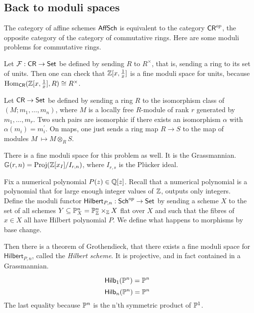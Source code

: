 \documentclass[11pt, english]{article}
\begin{document}
\subsection{Back to moduli spaces}

The category of affine schemes $\mathsf{AffSch}$ is equivalent to the category $\mathsf{CR}^{op}$, the opposite category of the category of commutative rings. Here are some moduli problems for commutative rings.

\begin{example}
Let $\mathcal F:\mathsf{CR} \to \mathsf{Set}$ be defined by sending $R$ to $R^\times$, that is, sending a ring to its set of units. Then one can check that $\mathbb{Z}[x,\frac 1x]$ is a fine moduli space for units, because $\operatorname{Hom}_{\mathsf{CR}}(\mathbb{Z}[x,\frac 1x],R) \cong R^\times$.
\end{example}

\begin{example}
Let $\mathsf{CR} \to \mathsf{Set}$ be defined by sending a ring $R$ to the isomorphism class of $(M;m_1,\dotsc,m_n)$, where $M$ is a locally free $R$-module of rank $r$ generated by $m_1,\dotsc,m_r$. Two such pairs are isomorphic if there exists an isomorphism $\alpha$ with $\alpha(m_i)=m_i^\prime$. On maps, one just sends a ring map $R \to S$ to the map of modules $M \ \mapsto M \otimes_R S$.

There is a fine moduli space for this problem as well. It is the Grassmannian. $\mathbb{G}(r,n)= \operatorname{Proj}(\mathbb{Z}[x_I]/I_{r,n})$, where $I_{r,s}$ is the Plücker ideal. 
\end{example}

\begin{example}
Fix a numerical polynomial $P(z) \in \mathbb{Q}[z]$. Recall that a numerical polynomial is a polynomial that for large enough integer values of $\mathbb{Z}$, outputs only integers. Define the moduli functor $\mathsf{Hilbert}_{P,n}:\mathsf{Sch}^{op} \to \mathsf{Set}$ by sending a scheme $X$ to the set of all schemes $Y \subseteq \mathbb{P}_X^n = \mathbb{P}_{\mathbb{Z}}^n \times_{\mathbb{Z}} X$ flat over $X$ and such that the fibres of $x \in X$ all have Hilbert polynomial $P$. We define what happens to morphisms by base change.

Then there is a theorem of Grothendieck, that there exists a fine moduli space for $\mathsf{Hilbert}_{P,n}$, called the \emph{Hilbert scheme}. It is projective, and in fact contained in a Grassmannian.
\end{example}

\begin{example}
\[
\mathsf{Hilb}_1(\mathbb{P}^n) = \mathbb{P} ^n
\]
\[
\mathsf{Hilb}_n(\mathbb{P} ^n) = \mathbb{P} ^n
\]
The last equality because $\mathbb{P}^n$ is the n'th symmetric product of $\mathbb{P} ^1$.
\end{example}
\end{document}
